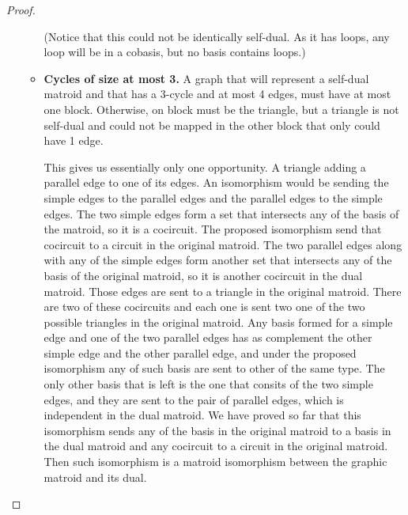\begin{proof}
\begin{enumerate}[label=(\roman*)]
\begin{itemize}
                        (Notice that this could not be identically self-dual. As it has loops, any loop will be in a cobasis, but no
                        basis contains loops.)\pn
                        
                    \item \textbf{Cycles of size at most 3.}
                        A graph that will represent a self-dual matroid and that has a 3-cycle and at most 4 edges, must have at most
                        one block. Otherwise, on block must be the triangle, but a triangle is not self-dual and could not be mapped 
                        in the other block that only could have 1 edge.\pn
                        
                        This gives us essentially only one opportunity. A triangle adding a parallel edge to one of its edges.
                        An isomorphism would be sending the simple edges to the parallel edges and the parallel edges to the simple 
                        edges. The two simple edges form a set that intersects any of the basis of the matroid, so it is a cocircuit. 
                        The proposed isomorphism send that cocircuit to a circuit in the original matroid. The two parallel edges along 
                        with any of the simple edges form another set that intersects any of the basis of the original matroid, so it 
                        is another cocircuit in the dual matroid. Those edges are sent to a triangle in the original matroid. There 
                        are two of these cocircuits and each one is sent two one of the two possible triangles in the original matroid.
                        Any basis formed for a simple edge and one of the two parallel edges has as complement the other simple edge 
                        and the other parallel edge, and under the proposed isomorphism any of such basis are sent to other of the 
                        same type. The only other basis that is left is the one that consits of the two simple edges, and they are 
                        sent to the pair of parallel edges, which is independent in the dual matroid. We have proved so far that this 
                        isomorphism sends any of the basis in the original matroid to a basis in the dual matroid and any cocircuit 
                        to a circuit in the original matroid. Then such isomorphism is a matroid isomorphism between the graphic matroid 
                        and its dual.\pn
                        

\end{itemize}
\end{enumerate}
\end{proof}
